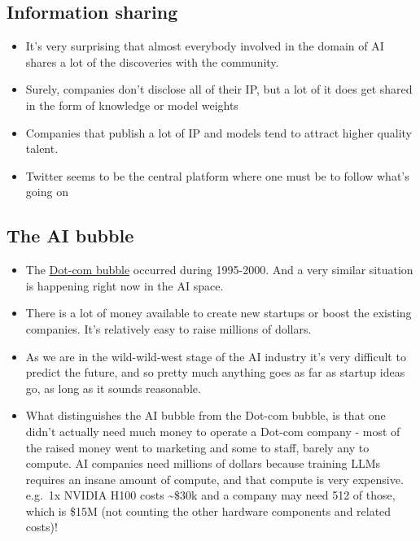 \documentclass[
]{report}
\providecommand{\tightlist}{%
  \setlength{\itemsep}{0pt}\setlength{\parskip}{0pt}}\usepackage{longtable,booktabs,array}
\begin{document}
\subsection{Information sharing}\label{information-sharing}

\begin{itemize}
\tightlist
\item
  It's very surprising that almost everybody involved in the domain of
  AI shares a lot of the discoveries with the community.
\item
  Surely, companies don't disclose all of their IP, but a lot of it does
  get shared in the form of knowledge or model weights
\item
  Companies that publish a lot of IP and models tend to attract higher
  quality talent.
\item
  Twitter seems to be the central platform where one must be to follow
  what's going on
\end{itemize}

\subsection{The AI bubble}\label{the-ai-bubble}

\begin{itemize}
\item
  The \href{https://en.wikipedia.org/wiki/Dot-com_bubble}{Dot-com
  bubble} occurred during 1995-2000. And a very similar situation is
  happening right now in the AI space.
\item
  There is a lot of money available to create new startups or boost the
  existing companies. It's relatively easy to raise millions of dollars.
\item
  As we are in the wild-wild-west stage of the AI industry it's very
  difficult to predict the future, and so pretty much anything goes as
  far as startup ideas go, as long as it sounds reasonable.
\item
  What distinguishes the AI bubble from the Dot-com bubble, is that one
  didn't actually need much money to operate a Dot-com company - most of
  the raised money went to marketing and some to staff, barely any to
  compute. AI companies need millions of dollars because training LLMs
  requires an insane amount of compute, and that compute is very
  expensive. e.g.~1x NVIDIA H100 costs \textasciitilde\$30k and a
  company may need 512 of those, which is \$15M (not counting the other
  hardware components and related costs)!
\end{itemize}
\end{document}
